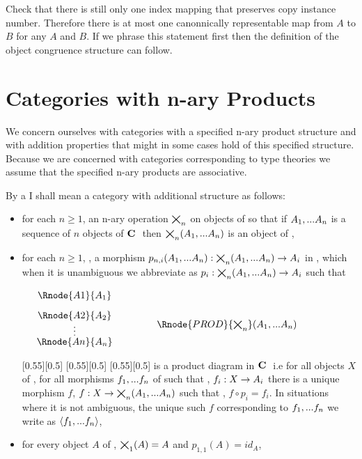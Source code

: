 \documentclass[10pt,a4paper]{scrartcl}
\begin{document}
Check that there is still only one index mapping that preserves copy instance number. Therefore
there is at most one canonnically representable map from $A$ to $B$ for any $A$ and $B$. If we phrase this statement first then the definition of the object congruence structure can follow.

\section{Categories with n-ary Products} 
We concern ourselves with categories with a specified n-ary product structure and 
 with addition properties that might in some cases hold of this specified structure.  
Because we are concerned with categories corresponding to type theories we assume that the specified n-ary products are associative.
\begin{definition}
By a  I shall mean a category \catcw with additional structure as follows:
\begin{itemize}
\item for each $n \geq 1$, an n-ary operation $\bigtimes_{n}$ on objects of \catcw so that if $A_1,...A_n$ is a sequence of $n$ objects of $\textbf{C}\ $ then $\bigtimes_{n}(A_1,...A_n)$ is an object of \catc,
\item for each $n \geq 1$, \foreachi, a morphism $p_{n,i}(A_1,...A_n):\bigtimes_{n}(A_1,...A_n) \rightarrow A_i$ in \catc, which when it is unambiguous we abbreviate as $p_i: \bigtimes_{n}(A_1,...A_n) \rightarrow A_i$
 such that

\begin{center}
\begin{displaymath}
\begin{array}{cp{.9cm}cp{.9cm}c}
\Rnode{A1}{A_1} & &   & &              \\ [0.3cm]
\Rnode{A2}{A_2} & &   & &              \\ [-0.1cm]
 \raisebox{-0.3cm}{\vdots} & & \Rnode{PROD}{\productn}(\An)  & &  \\ [0.2cm]
\Rnode{An}{A_n} & &   & & 
\end{array}
\end{displaymath}
\end{center}
[0.55][0.5]
{
\setlength{\arroffsetA}{2pt}
\setlength{\arroffsetA}{0pt}
}
[0.55][0.5]
{
\setlength{\arroffsetA}{2pt}
\setlength{\arroffsetA}{0pt}
}
[0.55][0.5]
is a product diagram in $\textbf{C}\ $ i.e for all objects $X$ of \catcw, for all morphisms $f_1,...f_n$ of \catcw such that \foreachi, $f_i:X \rightarrow A_i$ there is a unique
morphism $f$, $f: X \rightarrow \bigtimes_{n}(A_1,...A_n)$ such that \foreachi, $f \circ p_i = f_i$. In situations where it is not ambiguous, the unique such $f$ corresponding to $f_1,...f_n$ we write as
$\langle f_1,...f_n\rangle$,
\item
for every object $A$ of \catc, $\bigtimes_{1}(A)=A$ and $p_{1,1}(A) = id_A$,


\end{itemize}
\end{definition}
\end{document}
